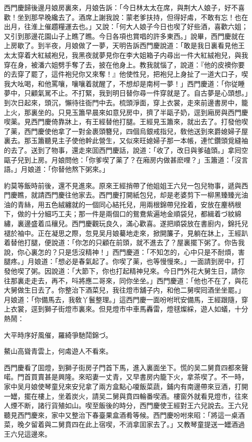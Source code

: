 西門慶歸後邊月娘房裏來，月娘告訴：「今日林太太在席，與荆大人娘子，好不喜歡！坐到那早晚纔去了。酒席上謝我說：蒙老爹扶持，但得好䖏，不敢有忘！也在出月，往淮上催趲糧運去也。」又說：「何大人娘子今日也喫了好些酒，喜歡六姐；又引到那邊花園山子上瞧了瞧。今日各項也賞唱的許多東西。」說畢，西門慶就在上房歇了。到半夜，月娘做了一夢，天明告訴西門慶說道：「敢是我日裏看見他王太太穿着大紅絨袍兒，我黑夜就夢見你在李大姐箱子内尋出一件大紅絨袍兒，與我穿在身，被潘六姐劈手奪了去，披在他身上。教我就惱了，說道：『他的皮襖你要的去穿了罷了，這件袍兒你又來奪！』他使性兒，把袍兒上身扯了一道大口子，喫我大吆喝，和他罵嚷，嚷嚷着就醒了，不想却是南柯一夢！」西門慶道：「你従睡夢中，只顧氣駡不止。不打緊，我到明日替你尋一件穿就是了。自古夢是心頭想。」到次日起來，頭沉，懶待往衙門中去。梳頭淨面，穿上衣裳，走來前邊書房中，籠上火，那裏坐的。只見玉簫早晨來如意兒房中，擠了半甌子奶，逕到廂房與西門慶喫薬。見西門慶倚靠牀上，有王經替他打腿。王經見玉簫來，就出去了。打發他喫了薬，西門慶使他拿了一對金裹頭簪兒，四個烏銀戒指兒，敎他送到來爵媳婦子屋裏去。那玉簫聽見主子使他幹此營生，又似來旺媳婦子那一本帳，連忙鑽頭覓縫袖的去了。送到了物事，還走來囬西門慶話，說道：「收了，改日與爹磕頭。」拿囘空甌子兒到上房。月娘問他：「你爹喫了薬了？在廂房内做甚麽哩？」玉簫道：「沒言語。」月娘道：「你替他熬下粥來。」

約莫等飯時前後，還不見進來。原來王經捎帶了他姐姐王六兒一包兒物事，遞與西門慶瞧，就請西門慶往他家去。西門慶打開紙包兒，却是老婆剪下一柳黑臻臻光油油的青絲，用五色絨纏就的一個同心結托兒，用兩根錦帶兒拴着，安放在麈柄根下，做的十分細巧工夫；那一件是兩個口的鴛鴦紫遍地金順袋兒，都緝着づ紋綿繡，裏邊盛着瓜穰兒。西門慶觀玩良久，滿心歡喜。遂把順袋放在書廚内，錦托兒褪於袖中。正在凝思之際，忽見吴月娘驀地走來，掀開簾子，見躺在牀上，王經趴着替他打腿，便說道：「你怎的只顧在前頭，就不進去了？屋裏擺下粥了。你告我說，你心裏怎的？只是恁沒精神！」西門慶道：「不知怎的，心中只是不耐煩，害腿疼。」月娘道：「想必是春氣起了。你喫了薬，也等慢慢來。」一面請到房中，打發他喫了粥。因說道：「大節下，你也打起精神兒來。今日門外花大舅生日，請你往那裏走走去，再不，呌將應二哥來，同你坐坐。」西門慶道：「他也不在了，與花大舅做生日去了。你整治下酒菜兒，我往燈巿舖子内，和他二舅喫囘酒坐坐罷。」月娘道：「你備馬去，我敎丫鬟整理。」這西門慶一面吩咐玳安備馬，王經跟隨，穿上衣裳，逕到獅子街燈巿裏來。但見燈巿中車馬轟雷，燈毬燦綵，遊人如蟻，十分熱鬧：

大平時序好風催，羅綺爭馳鬦錦づ。

鰲山高聳青雲上，何䖏遊人不看來。

西門慶看了囬燈，到獅子街房子門首下馬，進入裏面坐下。慌的吴二舅賁四都來聲喏。門首買賣甚是興隆。來昭妻一丈青，又早書房内籠下火，拿茶喫了。不一時，家中吴月娘使琴童兒來安兒拿了兩方盒點心嗄飯菜蔬，鋪内有南邊帶來豆酒，打開一罎，擺在樓上，坐着炭火，請吴二舅與賁四輪番喫酒。樓窗外就看見燈巿，往來人煙不断，諸行貨殖如山。喫至飯後的時分，西門慶使王經對王六兒說去。王六兒聽見西門慶來，家中又整治下春臺果盒酒肴等候。西門慶吩咐來昭：「將這一桌酒菜，晚夕留着與二舅賁四在此上宿喫，不消拿囬家去了。」又教琴童提送一罎酒過王六兒這邊來。

